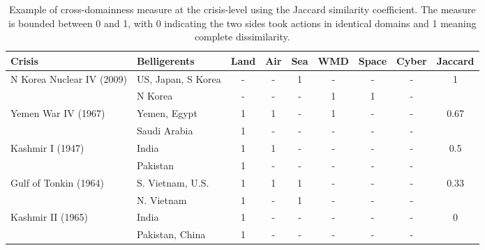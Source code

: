\documentclass[
]{article}
\begin{document}
\begin{table}[]
  \centering
  \begin{tabular}{|l|l|cccccc|c|}
  \hline
    \textbf{Crisis} & \textbf{Belligerents} & \multicolumn{1}{l}{\textbf{Land}} & \multicolumn{1}{l}{\textbf{Air}} & \multicolumn{1}{l}{\textbf{Sea}} & \multicolumn{1}{l}{\textbf{WMD}} & \multicolumn{1}{l}{\textbf{Space}} & \multicolumn{1}{l|}{\textbf{Cyber}} & \multicolumn{1}{l|}{\textbf{Jaccard}} \\ 
    \hline
    \multirow{2}{*}{N Korea Nuclear IV (2009)} & US, Japan, S Korea & - & - & 1 & - & - & - & \multirow{2}{*}{1} \\
     & N Korea & - & - & - & 1 & 1 & - & \\
    \hline
    \multirow{2}{*}{Yemen War IV (1967)} & Yemen, Egypt & 1 & 1 & - & 1 & - & - & \multirow{2}{*}{0.67} \\
      & Saudi Arabia & 1 & - & - & - & - & - & \\ 
    \hline
    \multirow{2}{*}{Kashmir I (1947)} & India & 1 & 1 & - & - & - & - & \multirow{2}{*}{0.5} \\
      & Pakistan & 1 & - & - & - & - & - & \\ 
    \hline
    \multirow{2}{*}{Gulf of Tonkin (1964)} & S. Vietnam, U.S. & 1 & 1 & 1 & - & - & - & \multirow{2}{*}{0.33} \\
      & N. Vietnam & 1 & - & 1 & - & - & - & \\ 
    \hline
    \multirow{2}{*}{Kashmir II (1965)} & India & 1 & - & - & - & - & - & \multirow{2}{*}{0} \\
     & Pakistan, China & 1 & - & - & - & - & - & \\ 
    \hline
  \end{tabular}
  \caption{Example of cross-domainness measure at the crisis-level using the Jaccard similarity coefficient. The measure is bounded between 0 and 1, with 0 indicating the two sides took actions in identical domains and 1 meaning complete dissimilarity.}
  \label{tab:jaccard}
  \end{table}
\end{document}
